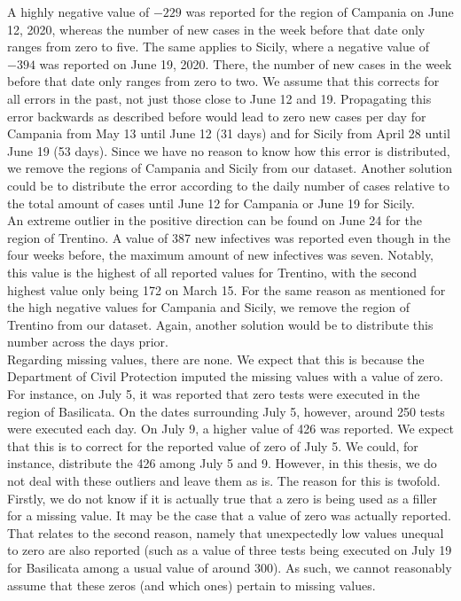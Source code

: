 \documentclass[12pt]{article}
\begin{document}
	A highly negative value of $-229$ was reported for the region of Campania on June 12, 2020, whereas the number of new cases in the week before that date only ranges from zero to five. The same applies to Sicily, where a negative value of $-394$ was reported on June 19, 2020. There, the number of new cases in the week before that date only ranges from zero to two. We assume that this corrects for all errors in the past, not just those close to June 12 and 19. Propagating this error backwards as described before would lead to zero new cases per day for Campania from May 13 until June 12 (31 days) and for Sicily from April 28 until June 19 (53 days). Since we have no reason to know how this error is distributed, we remove the regions of Campania and Sicily from our dataset. Another solution could be to distribute the error according to the daily number of cases relative to the total amount of cases until June 12 for Campania or June 19 for Sicily. \\
	
	An extreme outlier in the positive direction can be found on June 24 for the region of Trentino. A value of 387 new infectives was reported even though in the four weeks before, the maximum amount of new infectives was seven. Notably, this value is the highest of all reported values for Trentino, with the second highest value only being 172 on March 15. For the same reason as mentioned for the high negative values for Campania and Sicily, we remove the region of Trentino from our dataset. Again, another solution would be to distribute this number across the days prior. \\
	
	Regarding missing values, there are none. We expect that this is because the Department of Civil Protection imputed the missing values with a value of zero. For instance, on July 5, it was reported that zero tests were executed in the region of Basilicata. On the dates surrounding July 5, however, around 250 tests were executed each day. On July 9, a higher value of 426 was reported. We expect that this is to correct for the reported value of zero of July 5. We could, for instance, distribute the 426 among July 5 and 9. However, in this thesis, we do not deal with these outliers and leave them as is. The reason for this is twofold. Firstly, we do not know if it is actually true that a zero is being used as a filler for a missing value. It may be the case that a value of zero was actually reported. That relates to the second reason, namely that unexpectedly low values unequal to zero are also reported (such as a value of three tests being executed on July 19 for Basilicata among a usual value of around 300). As such, we cannot reasonably assume that these zeros (and which ones) pertain to missing values.
	
\end{document}
